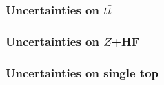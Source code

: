 

\subsubsection{Uncertainties on $t\bar{t}$}
\label{sec:acceptance_uncertainties_ttbar}



\subsubsection{Uncertainties on $Z$+HF}
\label{sec:acceptance_uncertainties_ZHF}



\subsubsection{Uncertainties on single top}
\label{sec:uncertainties_singletop}



